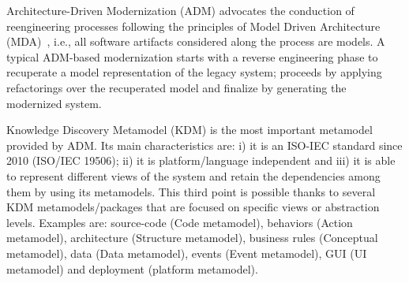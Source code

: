





Architecture-Driven Modernization (ADM) advocates the conduction of reengineering processes following the principles of Model Driven Architecture (MDA)~\cite{1686216, Heckel2008, 7051941, IRIDurelliCatalogo}, i.e., all software artifacts considered along the process are models. A typical ADM-based modernization starts with a reverse engineering phase to recuperate a model representation of the legacy system; proceeds by applying refactorings over the recuperated model and finalize by generating the modernized system.

Knowledge Discovery Metamodel (KDM) is the most important metamodel provided by ADM. Its main characteristics are: i) it is an ISO-IEC standard since 2010 (ISO/IEC 19506); ii) it is platform/language independent and iii) it is able to represent different views of the system and retain the dependencies among them by using its metamodels. This third point is possible thanks to several KDM metamodels/packages that are focused on specific views or abstraction levels. Examples are:  source-code (Code metamodel), behaviors (Action metamodel), architecture (Structure metamodel), business rules (Conceptual metamodel), data (Data metamodel), events (Event metamodel), GUI (UI metamodel) and deployment (platform metamodel).  

